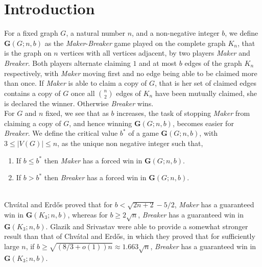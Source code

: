 \documentclass[a4paper,oneside,11pt]{report}
\begin{document}

\dissertationtableofcontents


\chapter{Introduction}

For a fixed graph $G$, a natural number $n$, and a non-negative integer $b$, we define $\textbf{G}(G;n,b)$ as the \textit{Maker}-\textit{Breaker} game played on the complete graph $K_n$, that is the graph on $n$ vertices with all vertices adjacent, by two players \textit{Maker} and \textit{Breaker}. Both players alternate claiming $1$ and at most $b$ edges of the graph $K_n$ respectively, with \textit{Maker} moving first and no edge being able to be claimed more than once. If \textit{Maker} is able to claim a copy of $G$, that is her set of claimed edges contains a copy of $G$ once all $\binom{n}{2}$ edges of $K_n$ have been mutually claimed, she is declared the winner. Otherwise \textit{Breaker} wins.\\

For $G$ and $n$ fixed, we see that as $b$ increases, the task of stopping \textit{Maker} from claiming a copy of $G$, and hence winning $\textbf{G}(G;n,b)$, becomes easier for \textit{Breaker}. We define the critical value $b^*$ of a game $\textbf{G}(G;n,b)$, with $3 \leqslant \lvert V(G) \rvert \leqslant n$, as the unique non negative integer such that,

\begin{enumerate}
  
    \item If $b \leqslant b^*$ then \textit{Maker} has a forced win in $\textbf{G}(G;n,b)$.
    \item If $b > b^*$ then \textit{Breaker} has a forced win in $\textbf{G}(G;n,b)$.

\end{enumerate}
~\\
Chvátal and Erdős \cite{chvatal1978biased} proved that for $b<\sqrt{2n+2}-5/2$, \textit{Maker} has a guaranteed win in $\textbf{G}(K_3;n,b)$, whereas for $b \geqslant 2\sqrt{n}$, \textit{Breaker} has a guaranteed win in $\textbf{G}(K_3;n,b)$. Glazik and Srivastav \cite{glazik2022new} were able to provide a somewhat stronger result than that of Chvátal and Erdős, in which they proved that for sufficiently large $n$, if $b \geqslant \sqrt{(8/3+o(1))n} \approx 1.663\sqrt{n}$, \textit{Breaker} has a guaranteed win in $\textbf{G}(K_3;n,b)$.\\
\end{document}
